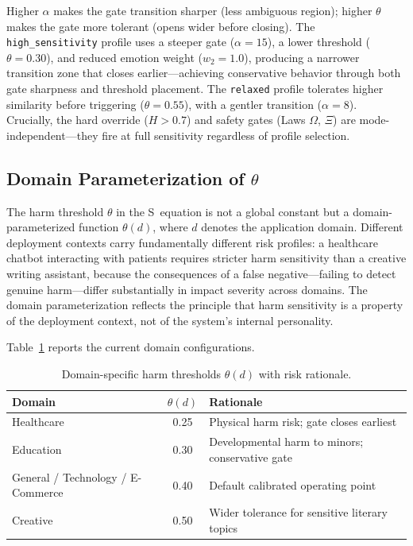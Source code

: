 \documentclass[11pt,a4paper]{article}
\begin{document}
Higher $\alpha$ makes the gate transition sharper (less ambiguous region); higher $\theta$ makes the gate more tolerant (opens wider before closing). The \texttt{high\_sensitivity} profile uses a steeper gate ($\alpha = 15$), a lower threshold ($\theta = 0.30$), and reduced emotion weight ($w_2 = 1.0$), producing a narrower transition zone that closes earlier---achieving conservative behavior through both gate sharpness and threshold placement. The \texttt{relaxed} profile tolerates higher similarity before triggering ($\theta = 0.55$), with a gentler transition ($\alpha = 8$). Crucially, the hard override ($H > 0.7$) and safety gates (Laws $\Omega$, $\Xi$) are mode-independent---they fire at full sensitivity regardless of profile selection.


\subsection{Domain Parameterization of $\theta$}
\label{sec:domain}

The harm threshold $\theta$ in the S~equation is not a global constant but a domain-parameterized function $\theta(d)$, where $d$ denotes the application domain. Different deployment contexts carry fundamentally different risk profiles: a healthcare chatbot interacting with patients requires stricter harm sensitivity than a creative writing assistant, because the consequences of a false negative---failing to detect genuine harm---differ substantially in impact severity across domains. The domain parameterization reflects the principle that harm sensitivity is a property of the deployment context, not of the system's internal personality.

Table~\ref{tab:domains} reports the current domain configurations.

\begin{table}[h]
\centering
\caption{Domain-specific harm thresholds $\theta(d)$ with risk rationale.}
\label{tab:domains}
\begin{tabular}{lcl}
\toprule
Domain & $\theta(d)$ & Rationale \\
\midrule
Healthcare & 0.25 & Physical harm risk; gate closes earliest \\
Education & 0.30 & Developmental harm to minors; conservative gate \\
General / Technology / E-Commerce & 0.40 & Default calibrated operating point \\
Creative & 0.50 & Wider tolerance for sensitive literary topics \\
\bottomrule
\end{tabular}
\end{table}
\end{document}
